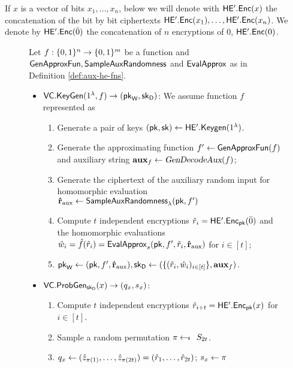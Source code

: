 If $x$ is a vector of bits $x_1, \dots, x_n$, below we will denote with $\mathsf{HE'.Enc}(x)$ the concatenation of the bit by bit ciphertexts $\mathsf{HE'.Enc}(x_1), \dots, \mathsf{HE'.Enc}(x_n)$. We denote by $\mathsf{HE'.Enc}(\bar{0})$ the concatenation of $n$ encryptions of $0$, $\mathsf{HE'.Enc}(0)$.


\begin{figure}
\begin{framed}
Let $f: \{0, 1\}^n \to \{0, 1\}^m$ be a function and $\mathsf{GenApproxFun}, \mathsf{SampleAuxRandomness}$ and $\mathsf{EvalApprox}$ as in Definition \ref{def:aux-he-fns}.
\begin{itemize}
\item $\mathsf{VC.KeyGen}(1^\lambda, f) \rightarrow (\mathsf{pk}_{\mathsf{W}}, \mathsf{sk}_{\mathsf{D}})$: We assume function $f$ represented as 
\begin{enumerate}
\item Generate a pair of keys $(\mathsf{pk},\mathsf{sk}) \gets \mathsf{HE'.Keygen}(1^\lambda)$.
\item Generate the approximating function $f' \gets \mathsf{GenApproxFun}(f)$ and auxiliary string $\mathbf{aux}_f \gets {\ensuremath{\textsl{GenDecodeAux}}}(f)$;
\item Generate the ciphertext of the auxiliary random input for homomorphic evaluation $\mathbf{\hat{r}}_{\text{aux}} \gets \mathsf{SampleAuxRandomness}_{\lambda}(\mathsf{pk}, f')$
\item Compute $t$ independent encryptions $\hat{r}_i = \mathsf{HE'.Enc}_{\mathsf{pk}}(\bar{0})$ and the homomorphic evaluations $\hat{w}_i = \hat{f}(\hat{r}_i) =  \mathsf{EvalApprox}_s(\mathsf{pk}, f', \hat{r}_i, \mathbf{\hat{r}}_{\text{aux}})$ for $i \in [t]$;
\item $\mathsf{pk}_{\mathsf{W}} \gets (\mathsf{pk}, f', \mathbf{\hat{r}}_{\text{aux}}), \mathsf{sk}_{\mathsf{D}} \gets (\{ (\hat{r}_i, \hat{w}_i)_{i \in [t]}\}, \mathbf{aux}_f)$.
\end{enumerate}
\item $\mathsf{VC.ProbGen}_{\mathsf{sk}_{\mathsf{D}}}(x) \rightarrow (q_x, s_x)$: 
\begin{enumerate}
\item Compute $t$ independent encryptions $\hat{r}_{i+t} = \mathsf{HE'.Enc}_{\mathsf{pk}}(x)$ for $i \in [t]$.
\item Sample a random permutation $\pi \sample S_{2t}$.
\item $q_x \gets (\hat{z}_{\pi(1)},\dots,\hat{z}_{\pi(2t)}) = (\hat{r}_1,\dots,\hat{r}_{2t})$; $s_x \gets \pi$
\end{enumerate}

\end{itemize}
\end{framed}
\end{figure}
